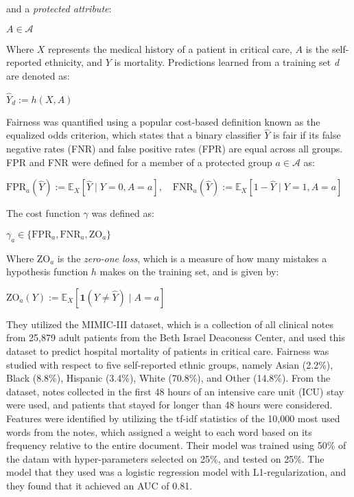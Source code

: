\documentclass[12pt]{article}
\begin{document}
\noindent and a \textit{protected attribute}:

\begin{center}
    $A \in \mathcal{A}$
\end{center}

Where $X$ represents the medical history of a patient in critical care, $A$ is the self-reported ethnicity, and $Y$ is mortality. Predictions learned from a training set \textit{d} are denoted as:

\begin{center}
    $\hat{Y}_d := h(X,A)$
\end{center}

Fairness was quantified using a popular cost-based definition known as the equalized odds criterion, which states that a binary classifier \textit{$\hat{Y}$} is fair if its false negative rates (FNR) and false positive rates (FPR) are equal across all groups. FPR and FNR were defined for a member of a protected group $a \in \mathcal{A}$ as:

\begin{center}
    $\text{FPR}_a(\hat{Y}) := \mathbb{E}_X[\hat{Y} \mid Y = 0, A = a], \quad \text{FNR}_a(\hat{Y}) := \mathbb{E}_X[1 - \hat{Y} \mid Y = 1, A = a]$
\end{center}

\newpage

\noindent The cost function $\gamma$ was defined as:

\begin{center}
    $\gamma_a \in \{\text{FPR}_a, \text{FNR}_a, \text{ZO}_a\}$
\end{center}

Where $\text{ZO}_a$ is the \textit{zero-one loss}, which is a measure of how many mistakes a hypothesis function $h$ makes on the training set, and is given by:

\begin{center}
    $\text{ZO}_a(Y) := \mathbb{E}_X[ \mathbf{1}(Y \neq \hat{Y}) \mid A = a]$
\end{center}

They utilized the MIMIC-III dataset, which is a collection of all clinical notes from 25,879 adult patients from the Beth Israel Deaconess Center, and used this dataset to predict hospital mortality of patients in critical care. Fairness was studied with respect to five self-reported ethnic groups, namely Asian (2.2\%), Black (8.8\%), Hispanic (3.4\%), White (70.8\%), and Other (14.8\%). From the dataset, notes collected in the first 48 hours of an intensive care unit (ICU) stay were used, and patients that stayed for longer than 48 hours were considered. Features were identified by utilizing the tf-idf statistics of the 10,000 most used words from the notes, which assigned a weight to each word based on its frequency relative to the entire document. Their model was trained using 50\% of the datam with hyper-parameters selected on 25\%, and tested on 25\%. The model that they used was a logistic regression model with L1-regularization, and they found that it achieved an AUC of 0.81.\ 
\end{document}
